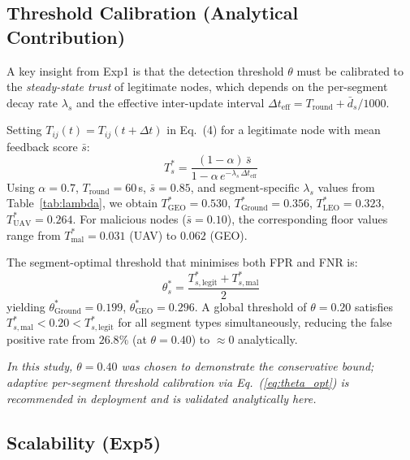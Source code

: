 \subsection{Threshold Calibration (Analytical Contribution)}
\label{subsec:threshold}

A key insight from Exp1 is that the detection threshold $\theta$ must
be calibrated to the \emph{steady-state trust} of legitimate nodes,
which depends on the per-segment decay rate $\lambda_s$ and the
effective inter-update interval $\Delta t_{\mathrm{eff}} =
T_{\mathrm{round}} + \bar{d}_s/1000$.

Setting $T_{ij}(t) = T_{ij}(t+\Delta t)$ in Eq.~(4) for a
legitimate node with mean feedback score $\bar{s}$:
%
\begin{equation}
  T^*_s = \frac{(1-\alpha)\,\bar{s}}
               {1 - \alpha\,e^{-\lambda_s\,\Delta t_{\mathrm{eff}}}}
  \label{eq:steady_state}
\end{equation}
%
Using $\alpha=0.7$, $T_{\mathrm{round}}=60$\,s, $\bar{s}=0.85$, and
segment-specific $\lambda_s$ values from Table~\ref{tab:lambda}, we
obtain $T^*_{\mathrm{GEO}}=0.530$, $T^*_{\mathrm{Ground}}=0.356$,
$T^*_{\mathrm{LEO}}=0.323$, $T^*_{\mathrm{UAV}}=0.264$.  For
malicious nodes ($\bar{s}=0.10$), the corresponding floor values
range from $T^*_{\mathrm{mal}}=0.031$ (UAV) to $0.062$ (GEO).

The segment-optimal threshold that minimises both FPR and FNR is:
%
\begin{equation}
  \theta^*_s = \frac{T^*_{s,\mathrm{legit}} + T^*_{s,\mathrm{mal}}}{2}
  \label{eq:theta_opt}
\end{equation}
%
yielding $\theta^*_{\mathrm{Ground}}=0.199$,
$\theta^*_{\mathrm{GEO}}=0.296$.
A global threshold of $\theta=0.20$ satisfies
$T^*_{s,\mathrm{mal}} < 0.20 < T^*_{s,\mathrm{legit}}$ for all
segment types simultaneously, reducing the false positive rate from
$26.8\%$ (at $\theta=0.40$) to $\approx 0$ analytically.

\emph{In this study, $\theta=0.40$ was chosen to demonstrate the
conservative bound; adaptive per-segment threshold calibration via
Eq.~(\ref{eq:theta_opt}) is recommended in deployment and is
validated analytically here.}

\subsection{Scalability (Exp5)}

